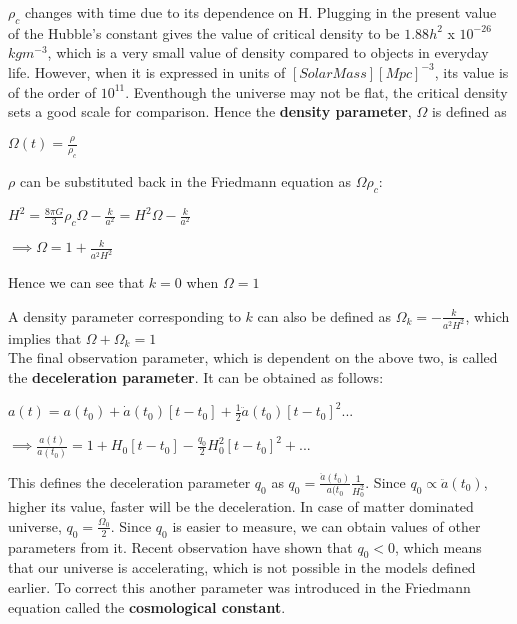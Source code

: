 \documentclass{article}
\begin{document}
$\rho_{c}$ changes with time due to its dependence on H. Plugging in the present value of the Hubble's constant gives the value of critical density to be $1.88h^2$ x $10^{-26}$ $kgm^{-3}$, which is a very small value of density compared to objects in everyday life. However, when it is expressed in units of $[Solar Mass][Mpc]^{-3}$, its value is of the order of $10^11$. Eventhough the universe may not be flat, the critical density sets a good scale for comparison. Hence the \textbf{density parameter}, $\Omega$ is defined as 

\begin{center}
    $\Omega(t) = \frac{\rho}{\rho_c}$
\end{center}

$\rho$ can be substituted back in the Friedmann equation as $\Omega\rho_c$:

\begin{center}
\begin{math}
  H^2 = \frac{8{\pi}G}{3}{\rho_c}\Omega - \frac{k}{a^2} = H^2\Omega - \frac{k}{a^2}
\end{math}
\end{center} 

\begin{center}
    $\implies \Omega = 1 + \frac{k}{a^2H^2}$
\end{center}

Hence we can see that $k=0$ when $\Omega = 1$

A density parameter corresponding to $k$ can also be defined as $\Omega_k = -\frac{k}{a^2H^2}$, which implies that $\Omega+\Omega_k=1$ \\

The final observation parameter, which is dependent on the above two, is called the \textbf{deceleration parameter}. It can be obtained as follows: 

\begin{center}
\begin{math}
    a(t) = a(t_0) + \dot{a}(t_0)[t-t_0] + \frac{1}{2}\ddot{a}(t_0)[t-t_0]^{2}...
\end{math}
\end{center}

\begin{center}
\begin{math}
   \implies \frac{a(t)}{a(t_0)} = 1+ H_0[t-t_0] - \frac{q_0}{2}H_0^2[t-t_0]^2 + ...
\end{math}
\end{center}

This defines the deceleration parameter $q_0$ as $q_0 = \frac{\ddot{a}(t_0)}{a(t_0}\frac{1}{H_0^2}$. Since $q_0 \propto \ddot{a}(t_0)$, higher its value, faster will be the deceleration. In case of matter dominated universe, $q_0 = \frac{\Omega_0}{2}$. Since $q_0$ is easier to measure, we can obtain values of other parameters from it. Recent observation have shown that $q_0<0$, which means that our universe is accelerating, which is not possible in the models defined earlier. To correct this another parameter was introduced in the Friedmann equation called the \textbf{cosmological constant}.
\end{document}
